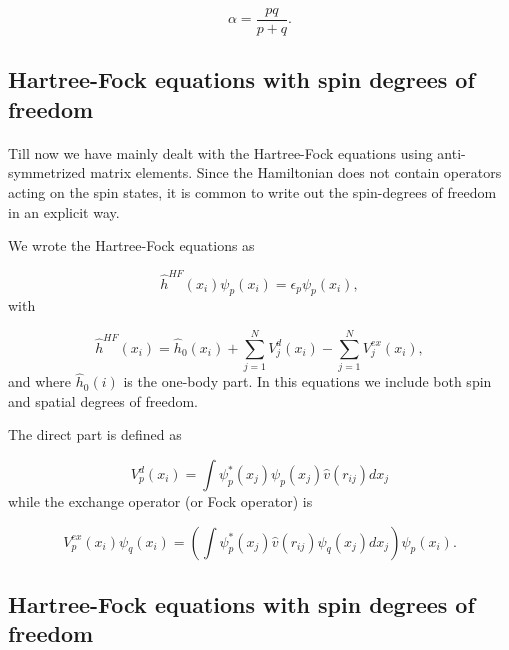 \documentclass[%
twoside,                 %
final,                   %
10pt]{article}
\begin{document}
\begin{equation}
  \alpha = \frac{pq}{p + q}.
\end{equation}



\subsection{Hartree-Fock equations with spin degrees of freedom}

\paragraph{}

Till now we have mainly dealt with the Hartree-Fock equations using anti-symmetrized matrix elements. Since the Hamiltonian does not 
contain operators acting on the spin states, it is common to write out the spin-degrees of freedom in an explicit way.

We wrote the Hartree-Fock equations as

\begin{equation*}
  \hat{h}^{HF}(x_i) \psi_{p}(x_i) = \epsilon_{p}\psi_{p}(x_i),
\end{equation*}
with

\begin{equation*}
  \hat{h}^{HF}(x_i)= \hat{h}_0(x_i) + \sum_{j=1}^NV_{j}^{d}(x_i) -
  \sum_{j=1}^NV_{j}^{ex}(x_i),
\end{equation*}
and where $\hat{h}_0(i)$ is the one-body part.
In this equations we include both spin and spatial degrees of freedom.

The direct part is defined as

\begin{equation*}
  V_{p}^{d}(x_i) = \int \psi_{p}^*(x_j)\psi_{p}(x_j)\hat{v}(r_{ij}) dx_j
\end{equation*}
while the exchange operator (or Fock operator) is

\begin{equation*}
  V_{p}^{ex}(x_i) \psi_{q}(x_i) 
  = \left(\int \psi_{p}^*(x_j) 
  \hat{v}(r_{ij})\psi_{q}(x_j)
  dx_j\right)\psi_{p}(x_i).
\end{equation*}



\subsection{Hartree-Fock equations with spin degrees of freedom}
\end{document}
